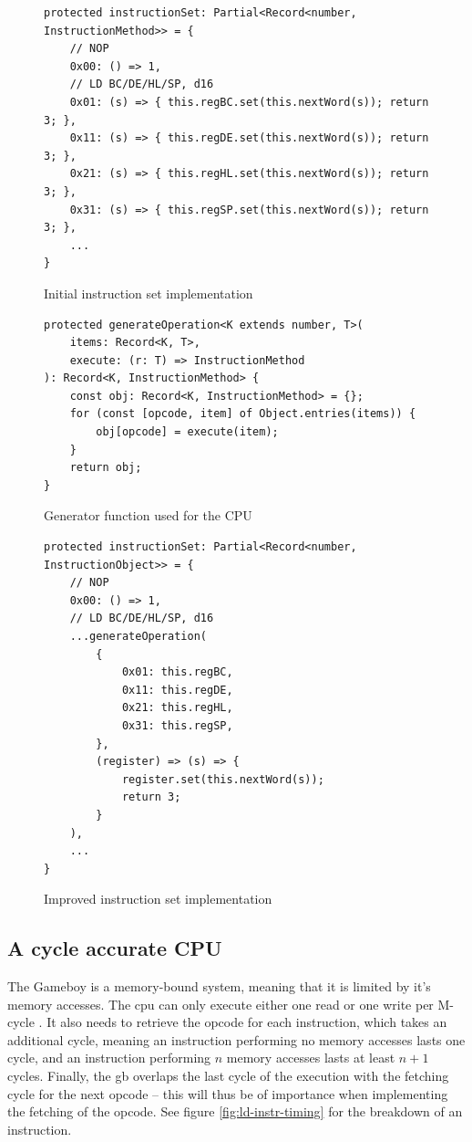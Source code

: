 \documentclass[11pt]{informatics-report}
\begin{document}
\begin{figure}[h]
    \begin{verbatim}
protected instructionSet: Partial<Record<number, InstructionMethod>> = {
    // NOP
    0x00: () => 1,
    // LD BC/DE/HL/SP, d16
    0x01: (s) => { this.regBC.set(this.nextWord(s)); return 3; },
    0x11: (s) => { this.regDE.set(this.nextWord(s)); return 3; },
    0x21: (s) => { this.regHL.set(this.nextWord(s)); return 3; },
    0x31: (s) => { this.regSP.set(this.nextWord(s)); return 3; },
    ...
}
    \end{verbatim}
    \caption{Initial instruction set implementation}
    \label{fig:instset-first}
\end{figure}

\begin{figure}[h]
    \begin{verbatim}
protected generateOperation<K extends number, T>(
    items: Record<K, T>,
    execute: (r: T) => InstructionMethod
): Record<K, InstructionMethod> {
    const obj: Record<K, InstructionMethod> = {};
    for (const [opcode, item] of Object.entries(items)) {
        obj[opcode] = execute(item);
    }
    return obj;
}
    \end{verbatim}
    \caption{Generator function used for the CPU}
    \label{fig:cpu-gen-function}
\end{figure}

\begin{figure}[h]
    \begin{verbatim}
protected instructionSet: Partial<Record<number, InstructionObject>> = {
    // NOP
    0x00: () => 1,
    // LD BC/DE/HL/SP, d16
    ...generateOperation(
        {
            0x01: this.regBC,
            0x11: this.regDE,
            0x21: this.regHL,
            0x31: this.regSP,
        },
        (register) => (s) => {
            register.set(this.nextWord(s));
            return 3;
        }
    ),
    ...
}
    \end{verbatim}
    \caption{Improved instruction set implementation}
    \label{fig:instset-second}
\end{figure}

\subsection{A cycle accurate CPU}

The Gameboy is a memory-bound system, meaning that it is limited by it's memory accesses. The \gls{cpu} can only execute either one read or one write per M-cycle \cite[CPU core timing]{gbctr}. It also needs to retrieve the opcode for each instruction, which takes an additional cycle, meaning an instruction performing no memory accesses lasts one cycle, and an instruction performing $n$ memory accesses lasts at least $n + 1$ cycles. Finally, the \gls{gb} overlaps the last cycle of the execution with the fetching cycle for the next opcode -- this will thus be of importance when implementing the fetching of the opcode. See figure \ref{fig:ld-instr-timing} for the breakdown of an instruction.
\end{document}
